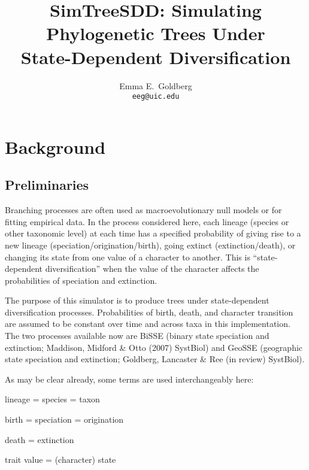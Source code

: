 \documentclass[10pt]{article}
\begin{document}
\title{ \Large{ {\bf SimTreeSDD}: {\bf Sim}ulating Phylogenetic {\bf Tree}s Under \\ {\bf S}tate-{\bf D}ependent {\bf D}iversification } }
\author{ \large{Emma E.\ Goldberg} \\ \normalsize{\texttt{eeg@uic.edu}} }
\maketitle

\tableofcontents

\section*{Background}

\subsection*{Preliminaries}

Branching processes are often used as macroevolutionary null models or for fitting empirical data.
In the process considered here, each lineage (species or other taxonomic level) at each time has a specified probability of giving rise to a new lineage (speciation/origination/birth), going extinct (extinction/death), or changing its state from one value of a character to another.
This is ``state-dependent diversification'' when the value of the character affects the probabilities of speciation and extinction.

The purpose of this simulator is to produce trees under state-dependent diversification processes.
Probabilities of birth, death, and character transition are assumed to be constant over time and across taxa in this implementation.
The two processes available now are BiSSE (binary state speciation and extinction; Maddison, Midford \& Otto (2007) SystBiol) and GeoSSE (geographic state speciation and extinction; Goldberg, Lancaster \& Ree (in review) SystBiol).

As may be clear already, some terms are used interchangeably here:
\begin{tightlist}
\item lineage = species = taxon
\item birth = speciation = origination
\item death = extinction
\item trait value = (character) state
\end{tightlist}
\end{document}
